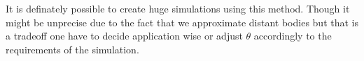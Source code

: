 It is definately possible to create huge simulations using this method. Though
it might be unprecise due to the fact that we approximate distant bodies but
that is a tradeoff one have to decide application wise or adjust
$\theta$ accordingly to the requirements of the simulation.
